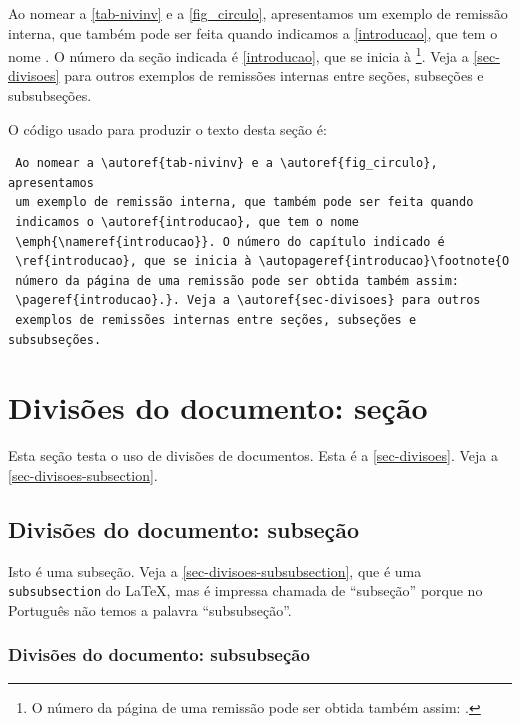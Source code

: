 \documentclass[article,12pt,oneside,a4paper,chapter=TITLE,english,brazil]{abntex2}
\begin{document}
\begin{anexosenv}
Ao nomear a \autoref{tab-nivinv} e a \autoref{fig_circulo}, apresentamos um exemplo de remissão interna, que também pode ser feita quando indicamos a \autoref{introducao}, que tem o nome \emph{}. O número da seção indicada é \ref{introducao}, que se inicia à \footnote{O número da página de uma remissão pode ser obtida também assim: \pageref{introducao}.}. Veja a \autoref{sec-divisoes} para outros exemplos de remissões internas entre seções, subseções e subsubseções.

O código usado para produzir o texto desta seção é:
\begin{verbatim}
 Ao nomear a \autoref{tab-nivinv} e a \autoref{fig_circulo}, apresentamos
 um exemplo de remissão interna, que também pode ser feita quando 
 indicamos o \autoref{introducao}, que tem o nome 
 \emph{\nameref{introducao}}. O número do capítulo indicado é 
 \ref{introducao}, que se inicia à \autopageref{introducao}\footnote{O 
 número da página de uma remissão pode ser obtida também assim:
 \pageref{introducao}.}. Veja a \autoref{sec-divisoes} para outros 
 exemplos de remissões internas entre seções, subseções e subsubseções.
\end{verbatim}


\section{Divisões do documento: seção}\label{sec-divisoes}

Esta seção testa o uso de divisões de documentos. Esta é a \autoref{sec-divisoes}. Veja a \autoref{sec-divisoes-subsection}.

\subsection{Divisões do documento: subseção}\label{sec-divisoes-subsection}

Isto é uma subseção. Veja a \autoref{sec-divisoes-subsubsection}, que é uma \texttt{subsubsection} do \LaTeX, mas é impressa chamada de ``subseção'' porque no Português não temos a palavra ``subsubseção''.

\subsubsection{Divisões do documento: subsubseção}
\label{sec-divisoes-subsubsection}


\end{anexosenv}
\end{document}
